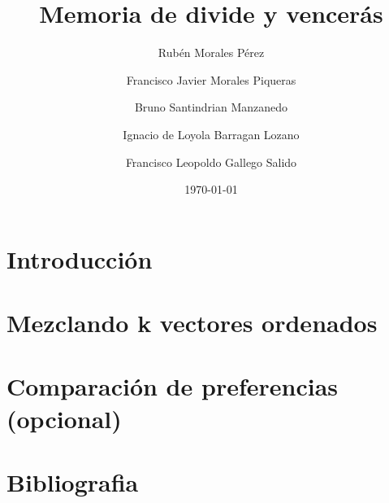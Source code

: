 \documentclass[11pt,spanish]{article} %
\title{Memoria de divide y vencerás}
\author{Rubén Morales Pérez
		\and Francisco Javier Morales Piqueras
		\and Bruno Santindrian Manzanedo
		\and Ignacio de Loyola Barragan Lozano
		\and Francisco Leopoldo Gallego Salido}
\date{\today}
\begin{document}
\maketitle
\tableofcontents %
\newpage
\setlength\parindent{0pt} %


\section{Introducci\'on}


\newpage
\section{Mezclando k vectores ordenados}


\newpage
\section{Comparaci\'on de preferencias (opcional)}


\newpage

\section{Bibliografia}

\newpage
\end{document}
